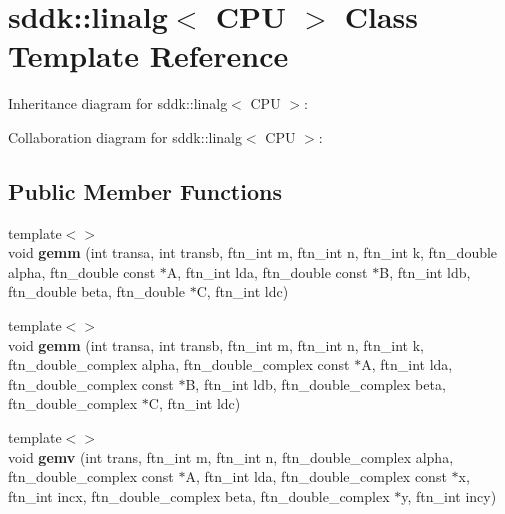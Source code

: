 \hypertarget{classsddk_1_1linalg_3_01_c_p_u_01_4}{}\section{sddk\+:\+:linalg$<$ C\+P\+U $>$ Class Template Reference}
\label{classsddk_1_1linalg_3_01_c_p_u_01_4}


Inheritance diagram for sddk\+:\+:linalg$<$ C\+P\+U $>$\+:


Collaboration diagram for sddk\+:\+:linalg$<$ C\+P\+U $>$\+:
\subsection*{Public Member Functions}
\begin{DoxyCompactItemize}
\item 
\hypertarget{classsddk_1_1linalg_3_01_c_p_u_01_4_a7916312befb2f03d92775071d94784e5}{}{\footnotesize template$<$$>$ }\\void {\bfseries gemm} (int transa, int transb, ftn\+\_\+int m, ftn\+\_\+int n, ftn\+\_\+int k, ftn\+\_\+double alpha, ftn\+\_\+double const $\ast$A, ftn\+\_\+int lda, ftn\+\_\+double const $\ast$B, ftn\+\_\+int ldb, ftn\+\_\+double beta, ftn\+\_\+double $\ast$C, ftn\+\_\+int ldc)\label{classsddk_1_1linalg_3_01_c_p_u_01_4_a7916312befb2f03d92775071d94784e5}

\item 
\hypertarget{classsddk_1_1linalg_3_01_c_p_u_01_4_aedff046239aa387ae944157a59fa1909}{}{\footnotesize template$<$$>$ }\\void {\bfseries gemm} (int transa, int transb, ftn\+\_\+int m, ftn\+\_\+int n, ftn\+\_\+int k, ftn\+\_\+double\+\_\+complex alpha, ftn\+\_\+double\+\_\+complex const $\ast$A, ftn\+\_\+int lda, ftn\+\_\+double\+\_\+complex const $\ast$B, ftn\+\_\+int ldb, ftn\+\_\+double\+\_\+complex beta, ftn\+\_\+double\+\_\+complex $\ast$C, ftn\+\_\+int ldc)\label{classsddk_1_1linalg_3_01_c_p_u_01_4_aedff046239aa387ae944157a59fa1909}

\item 
\hypertarget{classsddk_1_1linalg_3_01_c_p_u_01_4_a75890f2b94bb533e5c97aa01d2797100}{}{\footnotesize template$<$$>$ }\\void {\bfseries gemv} (int trans, ftn\+\_\+int m, ftn\+\_\+int n, ftn\+\_\+double\+\_\+complex alpha, ftn\+\_\+double\+\_\+complex const $\ast$A, ftn\+\_\+int lda, ftn\+\_\+double\+\_\+complex const $\ast$x, ftn\+\_\+int incx, ftn\+\_\+double\+\_\+complex beta, ftn\+\_\+double\+\_\+complex $\ast$y, ftn\+\_\+int incy)\label{classsddk_1_1linalg_3_01_c_p_u_01_4_a75890f2b94bb533e5c97aa01d2797100}


\end{DoxyCompactItemize}
